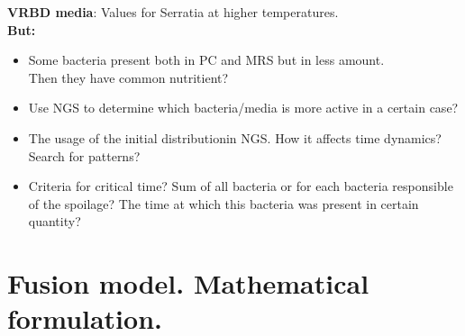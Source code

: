 \documentclass[10pt,A4paper]{article}
\begin{document}
\textbf{VRBD media}: Values for Serratia at higher temperatures.\\

\textbf{But:}
\begin{itemize}
    \item Some bacteria present both in PC and MRS but in less amount.\\
    Then they have common nutritient? 
    \item Use NGS to determine which bacteria/media is more active in a certain case?
    \item The usage of the initial distributionin NGS. How it affects time dynamics? Search for patterns?
    \item Criteria for critical time? Sum of all bacteria or for each bacteria responsible of the spoilage?
    The time at which this bacteria was present in certain quantity?
\end{itemize}

\newpage
\section{Fusion model. Mathematical formulation.}
\end{document}
